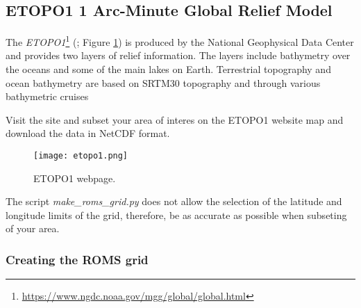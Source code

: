 \subsection{ETOPO1 1 Arc-Minute Global Relief Model}
\bigskip

\noindent The \textcolor{bleu_cite}{\textit{ETOPO1}\footnote{\textcolor{bleu_cite}{\href{https://www.ngdc.noaa.gov/mgg/global/global.html}{https://www.ngdc.noaa.gov/mgg/global/global.html}}}}
 (\cite{Amante2009}; Figure \textcolor{bleu_cite}{\ref{etopo1}}) 
is produced by the National Geophysical Data Center and provides two layers of relief information.
The layers include bathymetry over the oceans and some of the main lakes on Earth.
 Terrestrial topography and ocean bathymetry are based on SRTM30 topography and through various bathymetric cruises
\bigskip

\noindent Visit the site
and subset your area of interes on the ETOPO1 website map and download the data in NetCDF format.

\bigskip  
   
\begin{figure}[H]
    \centering
    \texttt{[image: etopo1.png]}
    \caption{ETOPO1 webpage.}
    \label{etopo1}
\end{figure}
\bigskip


\bigskip

\begin{tcolorbox}[enhanced,
    grow to left by   = 0cm,
    grow to right by  = 0cm,
    enlarge top by    = 0cm,
    enlarge bottom by = 0cm,
    tcbox raise base,
    boxrule           = 1.0pt,
    left              = 18mm,
    colframe          = red!50!black,coltext=red!25!black,colback=red!10!white,
    overlay           = {\begin{tcbclipinterior}\fill[red!75!blue!50!white] (frame.south west)
      rectangle node[text=white,font=\sffamily\bfseries\footnotesize,rotate=0] {WARNING} ([xshift=18mm]frame.north west);\end{tcbclipinterior}}]
The script \textit{make\_roms\_grid.py} does not allow the selection of the latitude and longitude limits of the grid, therefore, be as accurate as possible when subseting of your area.

\end{tcolorbox}
\bigskip

\subsubsection{Creating the ROMS grid}

